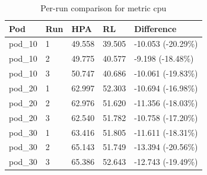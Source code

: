 \begin{table}[ht]
  \centering
  \caption{Per-run comparison for metric cpu}\label{tab:deskriptif-cpu-per-run}
  \begin{tabular}{lllll}
    \toprule
    Pod & Run & HPA & RL & Difference \\
    \midrule
    pod\_10 & 1 & 49.558 & 39.505 & -10.053 (-20.29\%) \\
    pod\_10 & 2 & 49.775 & 40.577 & -9.198 (-18.48\%) \\
    pod\_10 & 3 & 50.747 & 40.686 & -10.061 (-19.83\%) \\
    pod\_20 & 1 & 62.997 & 52.303 & -10.694 (-16.98\%) \\
    pod\_20 & 2 & 62.976 & 51.620 & -11.356 (-18.03\%) \\
    pod\_20 & 3 & 62.540 & 51.782 & -10.758 (-17.20\%) \\
    pod\_30 & 1 & 63.416 & 51.805 & -11.611 (-18.31\%) \\
    pod\_30 & 2 & 65.143 & 51.749 & -13.394 (-20.56\%) \\
    pod\_30 & 3 & 65.386 & 52.643 & -12.743 (-19.49\%) \\
    \bottomrule
  \end{tabular}
\end{table}